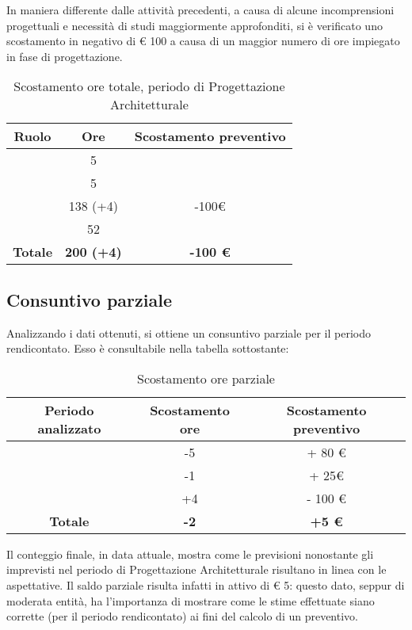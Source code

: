 In maniera differente dalle attività precedenti, a causa di alcune incomprensioni progettuali e necessità di studi maggiormente approfonditi, si è verificato uno scostamento in negativo di € 100 a causa di un maggior numero di ore impiegato in fase di progettazione.

\begin{table}[H]
	\begin{center}
		\begin{tabular}{|c|c|c|}
			\hline
			\textbf{Ruolo}	& \textbf{Ore}	& \textbf{Scostamento preventivo} \\
			\hline
			\Res	&	5	&		\\
			\hline
			\Amm	&	5	&		\\
			\hline
			\Prog   &	138 (+4)  &	-100€	\\
			\hline
			\Ver	&	52	&	\\
			\hline
			\textbf{Totale} & \textbf{200 (+4)} & \textbf{-100 €}\\
			\hline
		\end{tabular}
	\end{center}
	\caption{Scostamento ore totale, periodo di Progettazione Architetturale}
\end{table}

\subsection{Consuntivo parziale}

Analizzando i dati ottenuti, si ottiene un consuntivo parziale per il periodo rendicontato. Esso è consultabile nella tabella sottostante:

\begin{table}[H]
	\begin{center}
		\begin{tabular}{|c|c|c|}
			\hline
			\textbf{Periodo analizzato}	& \textbf{Scostamento ore}	& \textbf{Scostamento preventivo} \\
			\hline
			\AdR	&	-5	&	+ 80 €	\\
			\hline
			\ARD	&	-1	&	+ 25€	\\
			\hline
			\PA   &		+4  &	- 100 €	\\
			\hline
			\textbf{Totale} & \textbf{-2} & \textbf{+5 €} \\
			\hline
		\end{tabular}
	\end{center}
	\caption{Scostamento ore parziale}
\end{table}

Il conteggio finale, in data attuale, mostra come le previsioni nonostante gli imprevisti nel periodo di Progettazione Architetturale risultano in linea con le aspettative. Il saldo parziale risulta infatti in attivo di € 5: questo dato, seppur di moderata entità, ha l'importanza di mostrare come le stime effettuate siano corrette (per il periodo rendicontato) ai fini del calcolo di un preventivo.